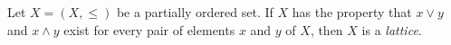 Let $X = (X, \leq)$ be a partially ordered set. If $X$ has the property that $x \vee y$ and $x \wedge y$ exist for every pair of elements $x$ and $y$ of $X$, then $X$ is a \textit{lattice}.
